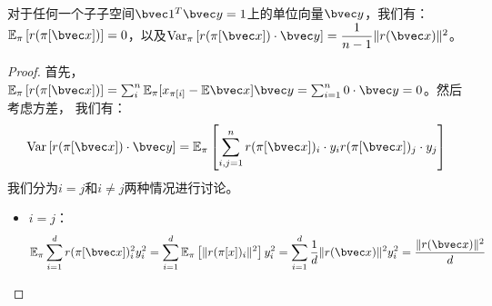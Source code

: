 \begin{theorem}
\label{thm:ss-perm:perm-dist}
    对于任何一个子子空间$\bvec 1^T \bvec y = 1$上的单位向量$\bvec y$，我们有：
    $\mathbb E_\pi \left[r(\pi[\bvec x])\right] = 0$，以及$\text{Var}_\pi \left[ r(\pi[\bvec x])\cdot \bvec y \right] = \dfrac{1}{n - 1} \Vert r(\bvec x) \Vert^2$。
\end{theorem}
%
\begin{proof}
首先，$\mathbb E_\pi  \left[r(\pi[\bvec x])\right] = \sum_{i}^n \mathbb E_\pi [x_{\pi[i]} - \mathbb E\bvec x] \bvec y = \sum_{i=1}^n 0 \cdot \bvec y = 0$。然后考虑方差，
我们有：
\begin{equation}
\begin{split}
    \text{Var}\left[ r(\pi[\bvec x])\cdot \bvec y \right] = \mathbb E_\pi \left[\sum_{i,j=1}^n  r(\pi[\bvec x])_i\cdot y_i r(\pi[\bvec x])_j\cdot y_j \right]
\end{split}
\end{equation}
我们分为$i = j$和$i \ne j$两种情况进行讨论。
\begin{itemize}
    \item $i = j$：
    \begin{equation}
        \mathbb E_\pi \sum_{i = 1}^d r(\pi[\bvec x])_i^2 y_i^2 = \sum_{i=1}^d \mathbb E_\pi \left[ \Vert r(\pi[x])_i\Vert^2 \right] y_i^2 = \sum_{i=1}^d \dfrac{1}{d} \Vert r(\bvec x) \Vert^2 y_i^2 = \dfrac{\Vert r(\bvec x)\Vert^2}d
    \end{equation}
    

\end{itemize}
\end{proof}
